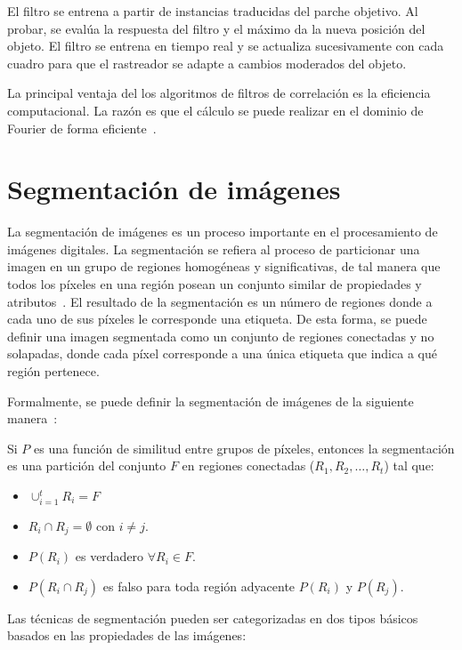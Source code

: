 El filtro se entrena a partir de instancias traducidas del parche objetivo. Al probar, se evalúa la respuesta del filtro y el máximo da la nueva posición del objeto. El filtro se entrena en tiempo real y se actualiza sucesivamente con cada cuadro para que el rastreador se adapte a cambios moderados del objeto.

La principal ventaja del los algoritmos de filtros de correlación es la eficiencia computacional. La razón es que el cálculo se puede realizar en el dominio de Fourier de forma eficiente~\cite{henriques2014high}. 



\section{Segmentación de imágenes}\label{section:seg}

La segmentación de imágenes es un proceso importante en el procesamiento de imágenes digitales. La segmentación se refiera al proceso de particionar una imagen en un grupo de regiones homogéneas y significativas, de tal manera que todos los píxeles en una región posean un conjunto similar de propiedades y atributos~\cite{sundararajan2017digital}. El resultado de la segmentación es un número de regiones donde a cada uno de sus píxeles le corresponde una etiqueta. De esta forma, se puede definir una imagen segmentada como un conjunto de regiones conectadas y no solapadas, donde cada píxel corresponde a una única etiqueta que indica a qué región pertenece.

Formalmente, se puede definir la segmentación de imágenes de la siguiente manera~\cite{pal1993review}:

\begin{definition}
	Si $P$ es una función de similitud entre grupos de píxeles, entonces la segmentación es una partición del conjunto $F$ en regiones conectadas ($R_1, R_2, \ldots, R_t$) tal que:
		\begin{itemize}
			\item $\cup_{i=1}^t R_i = F$
			\item $R_i \cap R_j = \emptyset$ con $i \neq j$.
			\item $P(R_i)$ es verdadero $\forall R_i \in F$.
			\item $P(R_i \cap R_j)$ es falso para toda región adyacente $P(R_i)$ y $P(R_j)$.
		\end{itemize}
\end{definition}

Las técnicas de segmentación pueden ser categorizadas en dos tipos básicos basados en las propiedades de las imágenes:

